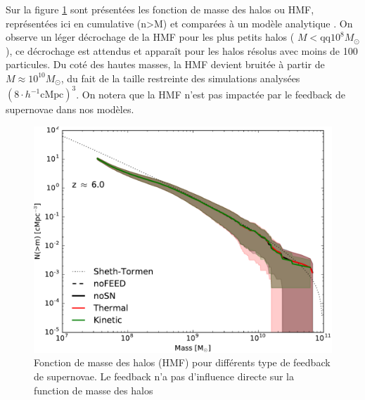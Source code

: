 Sur la figure \ref{fig:ghmf} sont présentées les fonction de masse des halos ou \ac{HMF}, représentées ici en cumulative (n>M) et comparées à un modèle analytique \citep{1999MNRAS.308..119S}.
On observe un léger décrochage de la \ac{HMF} pour les plus petits halos ( $M< \mathrm{qq} 10^8 M_\odot$), ce décrochage est attendus et apparaît pour les halos résolus avec moins de 100 particules.
Du coté des hautes masses, la \ac{HMF} devient bruitée à partir de $M \approx 10^{10} M_\odot$, du fait de la taille restreinte des simulations analysées $\left( 8\cdot h^{-1} \mathrm{cMpc} \right)^3$.
On notera que la \ac{HMF} n'est pas impactée par le feedback de supernovae dans nos modèles.



\begin{figure}
		\includegraphics[width=.95\linewidth]{img/03/ghmf.pdf}
        \caption[Fonctions de masses des halos]{Fonction de masse des halos (\ac{HMF}) pour différents type de feedback de supernovae.
        Le feedback n'a pas d'influence directe sur la function de masse des halos
 		\label{fig:ghmf}}
\end{figure}



